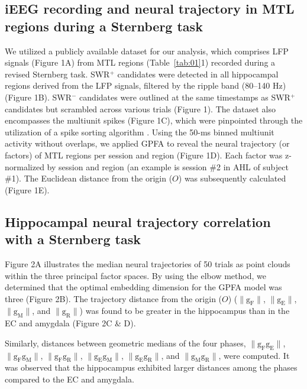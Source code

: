 \documentclass[final,3p,times,twocolumn]{elsarticle}
\begin{document}
\subsection{iEEG recording and neural trajectory in MTL regions during a Sternberg task}
We utilized a publicly available dataset \cite{boran_dataset_2020} for our analysis, which comprises LFP signals (Figure 1A) from MTL regions (Table~\ref{tab:01}1) recorded during a revised Sternberg task. SWR$^+$ candidates were detected in all hippocampal regions derived from the LFP signals, filtered by the ripple band (80--140 Hz) (Figure 1B). SWR$^-$ candidates were outlined at the same timestamps as SWR$^+$ candidates but scrambled across various trials (Figure 1). The dataset also encompasses the multiunit spikes (Figure 1C), which were pinpointed through the utilization of a spike sorting algorithm \cite{niediek_reliable_2016}. Using the 50-ms binned multiunit activity without overlaps, we applied GPFA \cite{yu_gaussian-process_2009} to reveal the neural trajectory (or factors) of MTL regions per session and region (Figure 1D). Each factor was z-normalized by session and region (an example is session \#2 in AHL of subject \#1). The Euclidean distance from the origin ($O$) was subsequently calculated (Figure 1E).

\subsection{Hippocampal neural trajectory correlation with a Sternberg task}
Figure 2A illustrates the median neural trajectories of 50 trials as point clouds within the three principal factor spaces. By using the elbow method, we determined that the optimal embedding dimension for the GPFA model was three (Figure 2B). The trajectory distance from the origin ($O$) ($\mathrm{\lVert g_{F} \rVert}$, $\mathrm{\lVert g_{E} \rVert}$, $\mathrm{\lVert g_{M} \rVert}$, and $\mathrm{\lVert g_{R} \rVert}$) was found to be greater in the hippocampus than in the EC and amygdala (Figure 2C \& D).

Similarly, distances between geometric medians of the four phases, $\mathrm{\lVert g_{F}g_{E} \rVert}$, $\mathrm{\lVert g_{F}g_{M} \rVert}$, $\mathrm{\lVert g_{F}g_{R} \rVert}$, $\mathrm{\lVert g_{E}g_{M} \rVert}$, $\mathrm{\lVert g_{E}g_{R} \rVert}$, and $\mathrm{\lVert g_{M}g_{R} \rVert}$, were computed. It was observed that the hippocampus exhibited larger distances among the phases compared to the EC and amygdala. 
\end{document}
